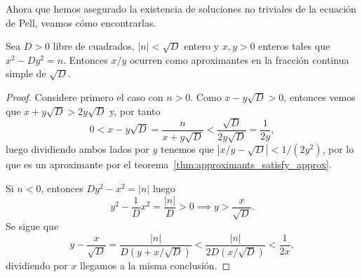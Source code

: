 \documentclass[teoria-numeros.tex]{subfiles}
\begin{document}
Ahora que hemos asegurado la existencia de soluciones no triviales de la ecuación de Pell, veamos cómo encontrarlas.
\begin{thm}
	Sea $D > 0$ libre de cuadrados, $|n| < \sqrt{D}$ entero y $x, y > 0$ enteros tales que $x^2 - Dy^2 = n$.
	Entonces $x/y$ ocurren como aproximantes en la fracción continua simple de $\sqrt{D}$.
\end{thm}
\begin{proof}
	Considere primero el caso con $n > 0$.
	Como $x - y\sqrt{D} > 0$, entonces vemos que $x + y\sqrt{D} > 2y \sqrt{D}$ y, por tanto
	$$ 0 < x - y \sqrt{D} = \frac{n}{x + y \sqrt{D}} < \frac{\sqrt{D}}{2y \sqrt{D}} = \frac{1}{2y}, $$
	luego dividiendo ambos lados por $y$ tenemos que $| x/y - \sqrt{D} | < 1/(2y^2)$, por lo que es un aproximante
	por el teorema~\ref{thm:approximants_satisfy_approx}.

	Si $n < 0$, entonces $Dy^2 - x^2 = |n|$ luego
	$$ y^2 - \frac{1}{D}x^2 = \frac{|n|}{D} > 0 \implies y > \frac{x}{\sqrt{D}}. $$
	Se sigue que
	$$ y - \frac{x}{\sqrt{D}} = \frac{|n|}{D(y + x/\sqrt{D})} < \frac{|n|}{2D(x / \sqrt{D})} < \frac{1}{2x}, $$
	dividiendo por $x$ llegamos a la misma conclusión.
\end{proof}
\end{document}
